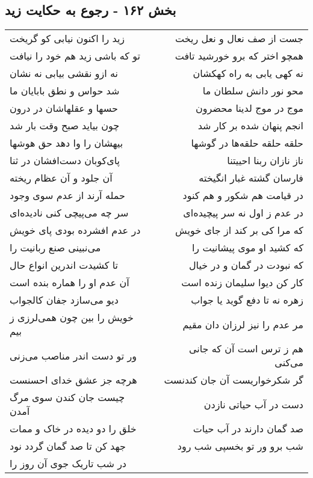 \begin{center}
\section*{بخش ۱۶۲ - رجوع به حکایت زید}
\label{sec:sh162}
\begin{longtable}{l p{0.5cm} r}
زید را اکنون نیابی کو گریخت
&&
جست از صف نعال و نعل ریخت
\\
تو که باشی زید هم خود را نیافت
&&
همچو اختر که برو خورشید تافت
\\
نه ازو نقشی بیابی نه نشان
&&
نه کهی یابی به راه کهکشان
\\
شد حواس و نطق بابایان ما
&&
محو نور دانش سلطان ما
\\
حسها و عقلهاشان در درون
&&
موج در موج لدینا محضرون
\\
چون بیاید صبح وقت بار شد
&&
انجم پنهان شده بر کار شد
\\
بیهشان را وا دهد حق هوشها
&&
حلقه حلقه حلقه‌ها در گوشها
\\
پای‌کوبان دست‌افشان در ثنا
&&
ناز نازان ربنا احییتنا
\\
آن جلود و آن عظام ریخته
&&
فارسان گشته غبار انگیخته
\\
حمله آرند از عدم سوی وجود
&&
در قیامت هم شکور و هم کنود
\\
سر چه می‌پیچی کنی نادیده‌ای
&&
در عدم ز اول نه سر پیچیده‌ای
\\
در عدم افشرده بودی پای خویش
&&
که مرا کی بر کند از جای خویش
\\
می‌نبینی صنع ربانیت را
&&
که کشید او موی پیشانیت را
\\
تا کشیدت اندرین انواع حال
&&
که نبودت در گمان و در خیال
\\
آن عدم او را هماره بنده است
&&
کار کن دیوا سلیمان زنده است
\\
دیو می‌سازد جفان کالجواب
&&
زهره نه تا دفع گوید یا جواب
\\
خویش را بین چون همی‌لرزی ز بیم
&&
مر عدم را نیز لرزان دان مقیم
\\
ور تو دست اندر مناصب می‌زنی
&&
هم ز ترس است آن که جانی می‌کنی
\\
هرچه جز عشق خدای احسنست
&&
گر شکرخواریست آن جان کندنست
\\
چیست جان کندن سوی مرگ آمدن
&&
دست در آب حیاتی نازدن
\\
خلق را دو دیده در خاک و ممات
&&
صد گمان دارند در آب حیات
\\
جهد کن تا صد گمان گردد نود
&&
شب برو ور تو بخسپی شب رود
\\
در شب تاریک جوی آن روز را

\end{longtable}
\end{center}
